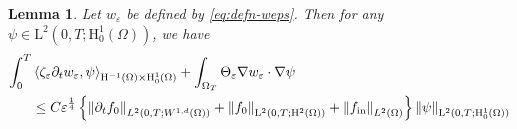 \documentclass[preprint, 12pt]{amsart}
\numberwithin{equation}{section}
\newtheorem{lemma}[theorem]{Lemma}
\numberwithin{equation}{section}
\newcommand{\eps}{\varepsilon}
\begin{document}
\begin{lemma}\label{lem:wkform-bound}
Let $w_\eps$ be defined by \eqref{eq:defn-weps}. Then for any $\psi\in\mathrm L^2(0,T;\mathrm H^1_0(\Omega))$, we have
\begin{equation}\label{eq:wkform-bound}
\begin{aligned}
\int_0^T & \left\langle \zeta_\eps\partial_{t}w_{\varepsilon},\psi \right\rangle_{\mathrm{H}^{-1}(\Omega) \times \mathrm{H}_0^1(\Omega)} 
+ \int_{\Omega_T} \Theta_\eps\nabla w_{\varepsilon} \cdot \nabla \psi 
\\
& \le C \eps^{\frac14} \left\{ \left\Vert \partial_tf_0\right\Vert_{L^2(0,T;W^{1,d}(\Omega))} + \left\Vert f_0\right\Vert_{\mathrm L^2(0,T;\mathrm H^2(\Omega))} + \left\Vert f_{{\rm{in}}}\right\Vert_{L^2(\Omega)} \right\}
\left\Vert \psi\right\Vert_{\mathrm L^2(0,T;\mathrm H^1_0(\Omega))}
\end{aligned}
\end{equation}
 \end{lemma}
\end{document}

